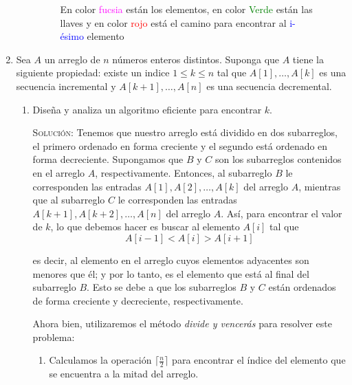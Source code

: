 \documentclass[letterpaper,11pt]{article}
\begin{document}
\begin{enumerate}
\begin{itemize}
\begin{figure}[h!]
        \caption{En color \textcolor{Fuchsia}{fucsia} están los elementos, en 
                 color \textcolor{Green}{Verde} están las llaves y en color 
                 \textcolor{Red}{rojo} está el camino para encontrar al
                 \textcolor{blue}{i-ésimo} elemento}
        \end{figure}
    \end{itemize}     
    
    \item Sea $A$ un arreglo de $n$ números enteros distintos. Suponga que $A$ 
    tiene la siguiente propiedad: existe un indice $1 \leq k \leq n$ tal que
    $A[1], \dots, A[k]$ es una secuencia incremental y 
    \mbox{$A[k+1], \dots, A[n]$} es una secuencia decremental. 

    \begin{enumerate}
		\item Diseña y analiza un algoritmo eficiente para encontrar $k$.
        
        \textsc{Solución:} Tenemos que nuestro arreglo está dividido en dos 
        subarreglos, el primero ordenado en forma creciente y el segundo está 
        ordenado en forma decreciente. Supongamos que $B$ y $C$ son los 
        subarreglos contenidos en el arreglo $A$, respectivamente. Entonces, 
        al subarreglo $B$ le corresponden las entradas $A[1], A[2], \ldots, 
        A[k]$ del arreglo $A$, mientras que al subarreglo $C$ le corresponden 
        las entradas $A[k+1], A[k+2], \ldots, A[n]$ del arreglo $A$. Así, para 
        encontrar el valor de $k$, lo que debemos hacer es buscar al elemento 
        $A[i]$ tal que
        \begin{equation}
            \label{eq: ej6-1}
            A[i-1] < A[i] > A[i+1]
        \end{equation} 
        
        es decir, al elemento en el arreglo cuyos elementos adyacentes son 
        menores que él; y por lo tanto, es el elemento que está al final del 
        subarreglo $B$. Esto se debe a que los subarreglos $B$ y $C$ están 
        ordenados de forma creciente y decreciente, respectivamente. 
        
        Ahora bien, utilizaremos el método \textit{divide y vencerás} para 
        resolver este problema: 
        \begin{enumerate}
            \item Calculamos la operación $\lceil \frac{n}{2} \rceil$ para 
            encontrar el índice del elemento que se encuentra a la mitad del 
            arreglo. 


\end{enumerate}
\end{enumerate}
\end{enumerate}
\end{document}
